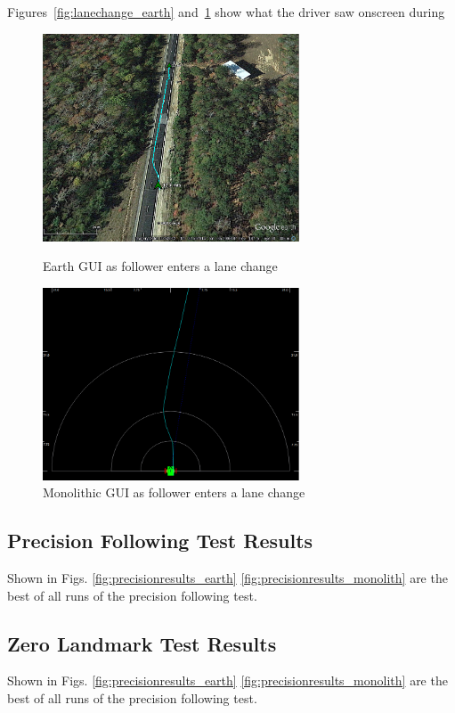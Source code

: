 Figures~\ref{fig:lanechange_earth} and~\ref{fig:lanechange_mono} show what the driver saw onscreen during 

\begin{figure}[ht] \centering
    \begin{minipage}[b]{0.45\linewidth} \centering 
        \includegraphics[width=3in]{./figs/lane_change.png}
        \caption{Earth GUI as follower enters a lane change} \label{fig:lanechange_earth}
    \end{minipage}
    \hspace{0.5cm}
    \begin{minipage}[b]{0.45\linewidth} \centering
        \includegraphics[width=3in]{./figs/lane_change_mono.png}
        \caption{Monolithic GUI as follower enters a lane change} \label{fig:lanechange_mono}
    \end{minipage}
\end{figure}




\subsection{Precision Following Test Results} \label{sec:precisionfollowingresults}

Shown in Figs. \ref{fig:precisionresults_earth} \ref{fig:precisionresults_monolith} are the best of all runs of the precision following test. 




\subsection{Zero Landmark Test Results} \label{sec:zerolandmarkresults}

Shown in Figs. \ref{fig:precisionresults_earth} \ref{fig:precisionresults_monolith} are the best of all runs of the precision following test. 

